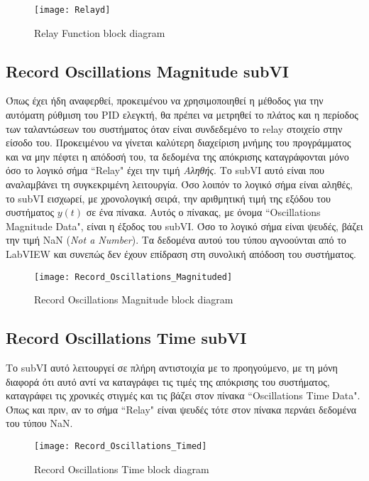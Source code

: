 \begin{figure}[H]
  \centering
  \texttt{[image: Relayd]}
  \caption{Relay Function block diagram}
  \label{fig:Relayd}
\end{figure}

\subsection{Record Oscillations Magnitude subVI}

Όπως έχει ήδη αναφερθεί, προκειμένου να χρησιμοποιηθεί η μέθοδος για την αυτόματη ρύθμιση του PID ελεγκτή, θα πρέπει να μετρηθεί το πλάτος και η περίοδος των ταλαντώσεων του συστήματος όταν είναι συνδεδεμένο το relay στοιχείο στην είσοδο του. Προκειμένου να γίνεται καλύτερη διαχείριση μνήμης του προγράμματος και να μην πέφτει η απόδοσή του, τα δεδομένα της απόκρισης καταγράφονται μόνο όσο το λογικό σήμα ``Relay" έχει την τιμή \textit{Αληθής}. Το subVI αυτό είναι που αναλαμβάνει τη συγκεκριμένη λειτουργία. Όσο λοιπόν το λογικό σήμα είναι αληθές, το subVI εισχωρεί, με χρονολογική σειρά, την αριθμητική τιμή της εξόδου του συστήματος $y(t)$ σε ένα πίνακα. Αυτός ο πίνακας, με όνομα ``Oscillations Magnitude Data", είναι η έξοδος του subVI. Όσο το λογικό σήμα είναι ψευδές, βάζει την τιμή NaN (\emph{Not a Number}). Τα δεδομένα αυτού του τύπου αγνοούνται από το LabVIEW και συνεπώς δεν έχουν επίδραση στη συνολική απόδοση του συστήματος.

\begin{figure}[h]
  \centering
  \texttt{[image: Record\_Oscillations\_Magnituded]}
  \caption{Record Oscillations Magnitude block diagram}
  \label{fig:Record_Oscillations_Magnituded}
\end{figure}

\subsection{Record Oscillations Time subVI}

Το subVI αυτό λειτουργεί σε πλήρη αντιστοιχία με το προηγούμενο, με τη μόνη διαφορά ότι αυτό αντί να καταγράφει τις τιμές της απόκρισης του συστήματος, καταγράφει τις χρονικές στιγμές και τις βάζει στον πίνακα ``Oscillations Time Data". Όπως και πριν, αν το σήμα ``Relay" είναι ψευδές τότε στον πίνακα περνάει δεδομένα του τύπου NaN.

\begin{figure}[h]
  \centering
  \texttt{[image: Record\_Oscillations\_Timed]}
  \caption{Record Oscillations Time block diagram}
  \label{fig:Record_Oscillations_Timed}
\end{figure}

